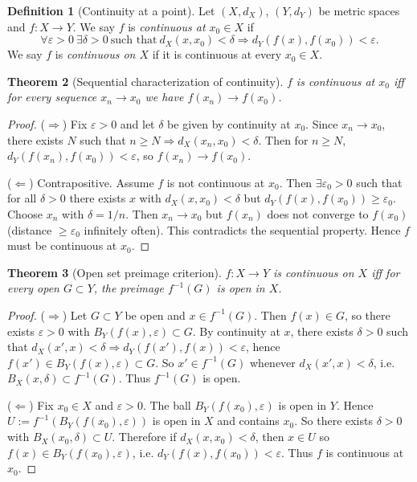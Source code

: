 \documentclass[11pt]{article}
\newtheorem{theorem}{Theorem}[section]
\theoremstyle{definition}
\newtheorem{definition}[theorem]{Definition}
\newcommand{\eps}{\varepsilon}
\begin{document}
\begin{definition}[Continuity at a point]
Let $(X,d_X)$, $(Y,d_Y)$ be metric spaces and $f:X\to Y$.
We say $f$ is \emph{continuous at $x_0\in X$} if
\[
\forall \eps>0\ \exists \delta>0\ \text{such that}\ d_X(x,x_0)<\delta\Rightarrow d_Y(f(x),f(x_0))<\eps.
\]
We say $f$ is \emph{continuous on $X$} if it is continuous at every $x_0\in X$.
\end{definition}

\begin{theorem}[Sequential characterization of continuity]
$f$ is continuous at $x_0$ iff for every sequence $x_n\to x_0$ we have $f(x_n)\to f(x_0)$.
\end{theorem}

\begin{proof}
($\Rightarrow$) Fix $\eps>0$ and let $\delta$ be given by continuity at $x_0$.
Since $x_n\to x_0$, there exists $N$ such that $n\ge N\Rightarrow d_X(x_n,x_0)<\delta$.
Then for $n\ge N$, $d_Y(f(x_n),f(x_0))<\eps$, so $f(x_n)\to f(x_0)$.

($\Leftarrow$) Contrapositive. Assume $f$ is not continuous at $x_0$.
Then $\exists \eps_0>0$ such that for all $\delta>0$ there exists $x$ with $d_X(x,x_0)<\delta$ but $d_Y(f(x),f(x_0))\ge \eps_0$.
Choose $x_n$ with $\delta=1/n$. Then $x_n\to x_0$ but $f(x_n)$ does not converge to $f(x_0)$ (distance $\ge\eps_0$ infinitely often).
This contradicts the sequential property. Hence $f$ must be continuous at $x_0$.
\end{proof}

\begin{theorem}[Open set preimage criterion]
$f:X\to Y$ is continuous on $X$ iff for every open $G\subset Y$, the preimage $f^{-1}(G)$ is open in $X$.
\end{theorem}

\begin{proof}
($\Rightarrow$) Let $G\subset Y$ be open and $x\in f^{-1}(G)$. Then $f(x)\in G$, so there exists $\eps>0$ with
$B_Y(f(x),\eps)\subset G$. By continuity at $x$, there exists $\delta>0$ such that
$d_X(x',x)<\delta\Rightarrow d_Y(f(x'),f(x))<\eps$, hence $f(x')\in B_Y(f(x),\eps)\subset G$.
So $x'\in f^{-1}(G)$ whenever $d_X(x',x)<\delta$, i.e. $B_X(x,\delta)\subset f^{-1}(G)$.
Thus $f^{-1}(G)$ is open.

($\Leftarrow$) Fix $x_0\in X$ and $\eps>0$. The ball $B_Y(f(x_0),\eps)$ is open in $Y$.
Hence $U:=f^{-1}(B_Y(f(x_0),\eps))$ is open in $X$ and contains $x_0$.
So there exists $\delta>0$ with $B_X(x_0,\delta)\subset U$.
Therefore if $d_X(x,x_0)<\delta$, then $x\in U$ so $f(x)\in B_Y(f(x_0),\eps)$, i.e. $d_Y(f(x),f(x_0))<\eps$.
Thus $f$ is continuous at $x_0$.
\end{proof}
\end{document}
